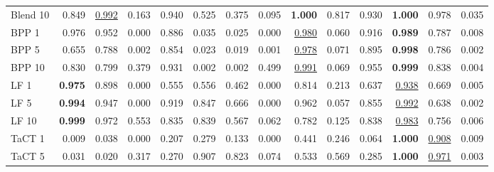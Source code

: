 \begin{table}[htbp]
\begin{adjustbox}{max width=\linewidth}
\begin{tabular}{lrrrrrrrrrrrrr}
Blend 10 & 0.849 & \underline{0.992} & \textcolor{black!45}{0.163} & 0.940 & 0.525 & \textcolor{black!45}{0.375} & \textcolor{black!45}{0.095} & \textbf{1.000} & 0.817 & 0.930 & \textbf{1.000} & 0.978 & \textcolor{black!45}{0.035} \\
BPP 1 & 0.976 & 0.952 & \textcolor{black!45}{0.000} & 0.886 & \textcolor{black!45}{0.035} & \textcolor{black!45}{0.025} & \textcolor{black!45}{0.000} & \underline{0.980} & \textcolor{black!45}{0.060} & 0.916 & \textbf{0.989} & 0.787 & \textcolor{black!45}{0.008} \\
BPP 5 & 0.655 & 0.788 & \textcolor{black!45}{0.002} & 0.854 & \textcolor{black!45}{0.023} & \textcolor{black!45}{0.019} & \textcolor{black!45}{0.001} & \underline{0.978} & \textcolor{black!45}{0.071} & 0.895 & \textbf{0.998} & 0.786 & \textcolor{black!45}{0.002} \\
BPP 10 & 0.830 & 0.799 & \textcolor{black!45}{0.379} & 0.931 & \textcolor{black!45}{0.002} & \textcolor{black!45}{0.002} & \textcolor{black!45}{0.499} & \underline{0.991} & \textcolor{black!45}{0.069} & 0.955 & \textbf{0.999} & 0.838 & \textcolor{black!45}{0.004} \\
LF 1 & \textbf{0.975} & 0.898 & \textcolor{black!45}{0.000} & 0.555 & 0.556 & \textcolor{black!45}{0.462} & \textcolor{black!45}{0.000} & 0.814 & \textcolor{black!45}{0.213} & 0.637 & \underline{0.938} & 0.669 & \textcolor{black!45}{0.005} \\
LF 5 & \textbf{0.994} & 0.947 & \textcolor{black!45}{0.000} & 0.919 & 0.847 & 0.666 & \textcolor{black!45}{0.000} & 0.962 & \textcolor{black!45}{0.057} & 0.855 & \underline{0.992} & 0.638 & \textcolor{black!45}{0.002} \\
LF 10 & \textbf{0.999} & 0.972 & 0.553 & 0.835 & 0.839 & 0.567 & \textcolor{black!45}{0.062} & 0.782 & \textcolor{black!45}{0.125} & 0.838 & \underline{0.983} & 0.756 & \textcolor{black!45}{0.006} \\
TaCT 1 & \textcolor{black!45}{0.009} & \textcolor{black!45}{0.038} & \textcolor{black!45}{0.000} & \textcolor{black!45}{0.207} & \textcolor{black!45}{0.279} & \textcolor{black!45}{0.133} & \textcolor{black!45}{0.000} & \textcolor{black!45}{0.441} & \textcolor{black!45}{0.246} & \textcolor{black!45}{0.064} & \textbf{1.000} & \underline{0.908} & \textcolor{black!45}{0.009} \\
TaCT 5 & \textcolor{black!45}{0.031} & \textcolor{black!45}{0.020} & \textcolor{black!45}{0.317} & \textcolor{black!45}{0.270} & 0.907 & 0.823 & \textcolor{black!45}{0.074} & 0.533 & 0.569 & \textcolor{black!45}{0.285} & \textbf{1.000} & \underline{0.971} & \textcolor{black!45}{0.003} \\

\end{tabular}
\end{adjustbox}
\end{table}
